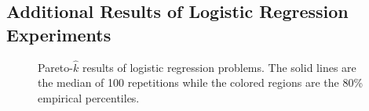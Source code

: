 
\subsection{Additional Results of Logistic Regression Experiments}


\begin{figure}[H]
  \centering
  \caption{Pareto-\(\widehat{k}\) results of logistic regression problems.
    The solid lines are the median of 100 repetitions while the colored regions are the 80\% empirical percentiles.
  }
\end{figure}

